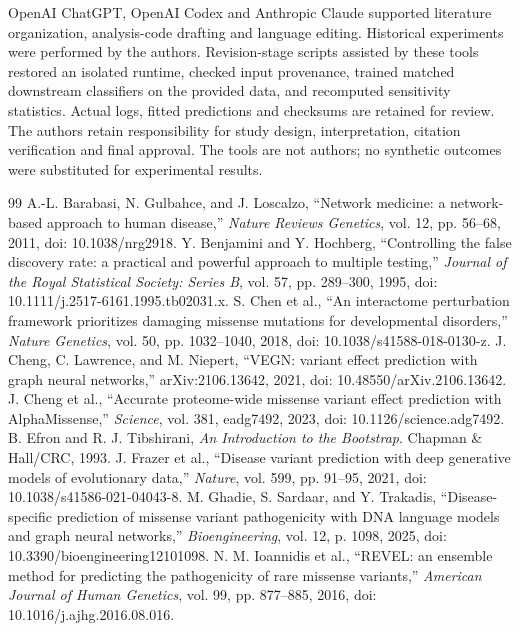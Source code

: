 \documentclass[conference]{IEEEtran}
\begin{document}
OpenAI ChatGPT, OpenAI Codex and Anthropic Claude supported literature organization, analysis-code drafting and language editing. Historical experiments were performed by the authors. Revision-stage scripts assisted by these tools restored an isolated runtime, checked input provenance, trained matched downstream classifiers on the provided data, and recomputed sensitivity statistics. Actual logs, fitted predictions and checksums are retained for review. The authors retain responsibility for study design, interpretation, citation verification and final approval. The tools are not authors; no synthetic outcomes were substituted for experimental results.

\begin{thebibliography}{99}
 A.-L. Barabasi, N. Gulbahce, and J. Loscalzo, ``Network medicine: a network-based approach to human disease,'' \emph{Nature Reviews Genetics}, vol. 12, pp. 56--68, 2011, doi: 10.1038/nrg2918.
 Y. Benjamini and Y. Hochberg, ``Controlling the false discovery rate: a practical and powerful approach to multiple testing,'' \emph{Journal of the Royal Statistical Society: Series B}, vol. 57, pp. 289--300, 1995, doi: 10.1111/j.2517-6161.1995.tb02031.x.
 S. Chen et al., ``An interactome perturbation framework prioritizes damaging missense mutations for developmental disorders,'' \emph{Nature Genetics}, vol. 50, pp. 1032--1040, 2018, doi: 10.1038/s41588-018-0130-z.
 J. Cheng, C. Lawrence, and M. Niepert, ``VEGN: variant effect prediction with graph neural networks,'' arXiv:2106.13642, 2021, doi: 10.48550/arXiv.2106.13642.
 J. Cheng et al., ``Accurate proteome-wide missense variant effect prediction with AlphaMissense,'' \emph{Science}, vol. 381, eadg7492, 2023, doi: 10.1126/science.adg7492.
 B. Efron and R. J. Tibshirani, \emph{An Introduction to the Bootstrap}. Chapman \& Hall/CRC, 1993.
 J. Frazer et al., ``Disease variant prediction with deep generative models of evolutionary data,'' \emph{Nature}, vol. 599, pp. 91--95, 2021, doi: 10.1038/s41586-021-04043-8.
 M. Ghadie, S. Sardaar, and Y. Trakadis, ``Disease-specific prediction of missense variant pathogenicity with DNA language models and graph neural networks,'' \emph{Bioengineering}, vol. 12, p. 1098, 2025, doi: 10.3390/bioengineering12101098.
 N. M. Ioannidis et al., ``REVEL: an ensemble method for predicting the pathogenicity of rare missense variants,'' \emph{American Journal of Human Genetics}, vol. 99, pp. 877--885, 2016, doi: 10.1016/j.ajhg.2016.08.016.

\end{thebibliography}
\end{document}
